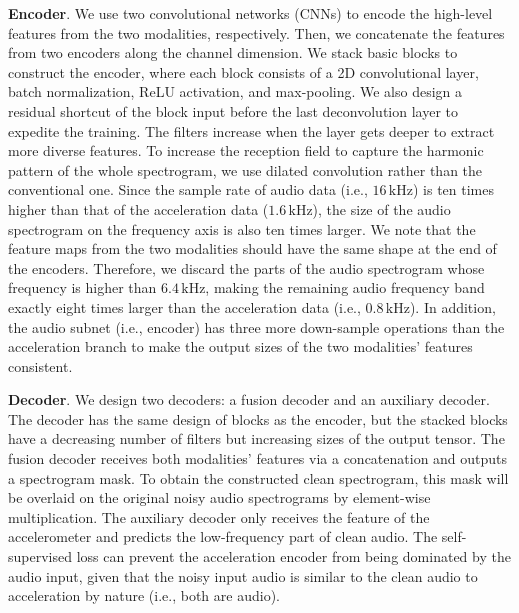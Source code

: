\noindent\textbf{Encoder}.
We use two convolutional networks (CNNs) to encode the high-level features from the two modalities, respectively. Then, we concatenate the features from two encoders along the channel dimension. We stack basic blocks to construct the encoder, where each block consists of a 2D convolutional layer, batch normalization, ReLU activation, and max-pooling. We also design a residual shortcut of the block input before the last deconvolution layer to expedite the training. The filters increase when the layer gets deeper to extract more diverse features. To increase the reception field to capture the harmonic pattern of the whole spectrogram, we use dilated convolution rather than the conventional one.
Since the sample rate of audio data (i.e., $16\,\text{kHz}$) is ten times higher than that of the acceleration data ($1.6\,\text{kHz}$), the size of the audio spectrogram on the frequency axis is also ten times larger. We note that the feature maps from the two modalities should have the same shape at the end of the encoders. Therefore, we discard the parts of the audio spectrogram whose frequency is higher than $6.4\,\text{kHz}$, making the remaining audio frequency band exactly eight times larger than the acceleration data (i.e., $0.8\,\text{kHz}$). In addition, the audio subnet (i.e., encoder) has three more down-sample operations than the acceleration branch to make the output sizes of the two modalities' features consistent. 

\noindent\textbf{Decoder}.
We design two decoders: a fusion decoder and an auxiliary decoder. The decoder has the same design of blocks as the encoder, but the stacked blocks have a decreasing number of filters but increasing sizes of the output tensor. 
The fusion decoder receives both modalities' features via a concatenation and outputs a spectrogram mask. To obtain the constructed clean spectrogram, this mask will be overlaid on the original noisy audio spectrograms by element-wise multiplication. 
The auxiliary decoder only receives the feature of the accelerometer and predicts the low-frequency part of clean audio. The self-supervised loss can prevent the acceleration encoder from being dominated by the audio input, given that the noisy input audio is similar to the clean audio to acceleration by nature (i.e., both are audio).

